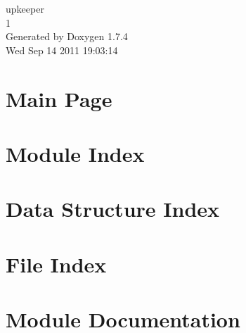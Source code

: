 \documentclass[a4paper]{book}
\begin{document}
\begin{titlepage}
\vspace*{7cm}
\begin{center}
{\Large upkeeper \\[1ex]\large 1 }\\
\vspace*{1cm}
{\large Generated by Doxygen 1.7.4}\\
\vspace*{0.5cm}
{\small Wed Sep 14 2011 19:03:14}\\
\end{center}
\end{titlepage}
\clearemptydoublepage
{}
\tableofcontents
\clearemptydoublepage
{}
\chapter{Main Page}
\label{index}
\chapter{Module Index}

\chapter{Data Structure Index}

\chapter{File Index}

\chapter{Module Documentation}









\end{document}
